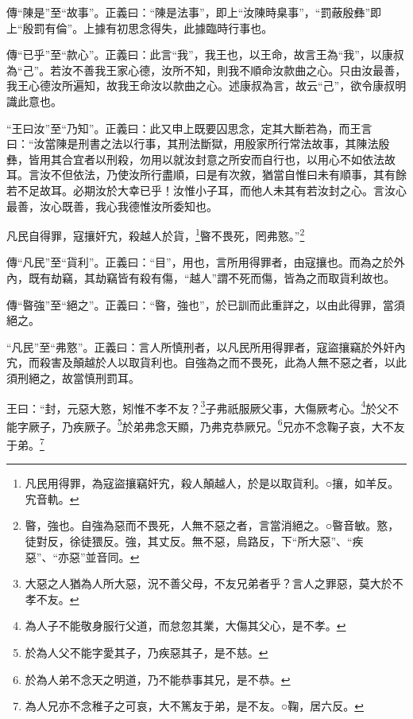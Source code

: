 {\noindent\zhuan{}\fzbyks 傳“陳是”至“故事”。正義曰：“陳是法事”，即上“汝陳時臬事”，“罰蔽殷彝”即上“殷罰有倫”。上據有初思念得失，此據臨時行事也。 \par}

{\noindent\zhuan{}\fzbyks 傳“已乎”至“款心”。正義曰：此言“我”，我王也，以王命，故言王為“我”，以康叔為“己”。若汝不善我王家心德，汝所不知，則我不順命汝款曲之心。只由汝最善，我王心德汝所遍知，故我王命汝以款曲之心。述康叔為言，故云“己”，欲令康叔明識此意也。 \par}

{\noindent\shu{}\fzkt “王曰汝”至“乃知”。正義曰：此又申上既要囚思念，定其大斷若為，而王言曰：“汝當陳是刑書之法以行事，其刑法斷獄，用殷家所行常法故事，其陳法殷彝，皆用其合宜者以刑殺，勿用以就汝封意之所安而自行也，以用心不如依法故耳。言汝不但依法，乃使汝所行盡順，曰是有次敘，猶當自惟曰未有順事，其有餘若不足故耳。必期汝於大幸已乎！汝惟小子耳，而他人未其有若汝封之心。言汝心最善，汝心既善，我心我德惟汝所委知也。 \par}

凡民自得罪，寇攘奸宄，殺越人於貨，\footnote{凡民用得罪，為寇盜攘竊奸宄，殺人顛越人，於是以取貨利。○攘，如羊反。宄音軌。}暋不畏死，罔弗憝。”\footnote{暋，強也。自強為惡而不畏死，人無不惡之者，言當消絕之。○暋音敏。憝，徒對反，徐徒猥反。強，其丈反。無不惡，烏路反，下“所大惡”、“疾惡”、“亦惡”並音同。}


{\noindent\zhuan{}\fzbyks 傳“凡民”至“貨利”。正義曰：“目”，用也，言所用得罪者，由寇攘也。而為之於外內，既有劫竊，其劫竊皆有殺有傷，“越人”謂不死而傷，皆為之而取貨利故也。 \par}

{\noindent\zhuan{}\fzbyks 傳“暋強”至“絕之”。正義曰：“暋，強也”，於已訓而此重詳之，以由此得罪，當須絕之。 \par}

{\noindent\shu{}\fzkt “凡民”至“弗憝”。正義曰：言人所慎刑者，以凡民所用得罪者，寇盜攘竊於外奸內宄，而殺害及顛越於人以取貨利也。自強為之而不畏死，此為人無不惡之者，以此須刑絕之，故當慎刑罰耳。 \par}

王曰：“封，元惡大憝，矧惟不孝不友？\footnote{大惡之人猶為人所大惡，況不善父母，不友兄弟者乎？言人之罪惡，莫大於不孝不友。}子弗祇服厥父事，大傷厥考心。\footnote{為人子不能敬身服行父道，而怠忽其業，大傷其父心，是不孝。}於父不能字厥子，乃疾厥子。\footnote{於為人父不能字愛其子，乃疾惡其子，是不慈。}於弟弗念天顯，乃弗克恭厥兄。\footnote{於為人弟不念天之明道，乃不能恭事其兄，是不恭。}兄亦不念鞠子哀，大不友于弟。\footnote{為人兄亦不念稚子之可哀，大不篤友于弟，是不友。○鞠，居六反。}


